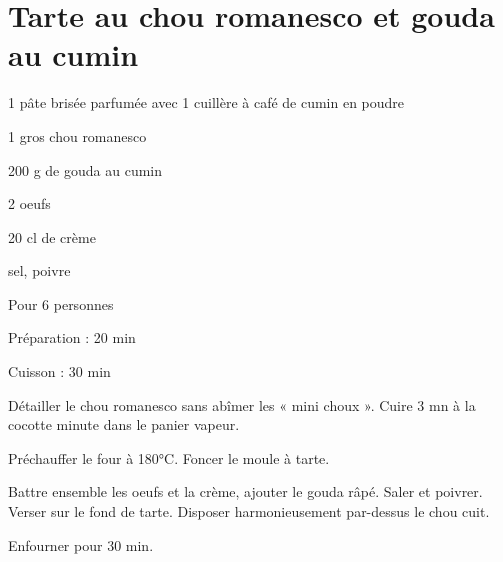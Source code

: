 \section{Tarte au chou romanesco et gouda au cumin}

\begin{ingredients}
\item 1 pâte brisée parfumée avec 1 cuillère à café de cumin en poudre
\item 1 gros chou romanesco
\item 200 g de gouda au cumin
\item 2 oeufs
\item 20 cl de crème
\item sel, poivre
\end{ingredients}
\begin{infos}
\item Pour 6 personnes		%
\item Préparation : 20 min		%
\item Cuisson : 30 min			%
\end{infos}
\begin{etapes}
\item Détailler le chou romanesco sans abîmer les « mini choux ». Cuire 3 mn à la cocotte minute dans le panier vapeur.
\item Préchauffer le four à 180°C. Foncer le moule à tarte.
\item Battre ensemble les oeufs et la crème, ajouter le gouda râpé. Saler et poivrer. Verser sur le fond de tarte. Disposer harmonieusement par-dessus le chou cuit.
\item Enfourner pour 30 min.
\end{etapes}
\begin{conseils}
\end{conseils}